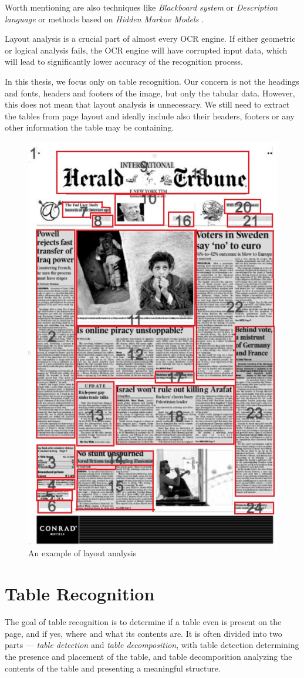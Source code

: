 Worth mentioning are also techniques like \emph{Blackboard system} or \emph{Description language} or methods based on \emph{Hidden Markov Models} \cite{logicalLayoutOther}.

Layout analysis is a crucial part of almost every OCR engine. If either geometric or logical analysis fails, the OCR engine will have corrupted input data, which will lead to significantly lower accuracy of the recognition process. 

In this thesis, we focus only on table recognition. Our concern is not the headings and fonts, headers and footers of the image, but only the tabular data. However, this does not mean that layout analysis is unnecessary. We still need to extract the tables from page layout and ideally include also their headers, footers or any other information the table may be containing.

\begin{figure}[H]
\centering
\includegraphics[width=0.5\linewidth]{img/readingOrder.jpg}
\caption{An example of layout analysis \citep{hadjar2004xed}} \label{fig:1a}
\end{figure}

\section{Table Recognition}

The goal of table recognition is to determine if a table even is present on the page, and if yes, where and what its contents are. It is often divided into two parts --- \emph{table detection} and \emph{table decomposition}, with table detection determining the presence and placement of the table, and table decomposition analyzing the contents of the table and presenting a meaningful structure.

